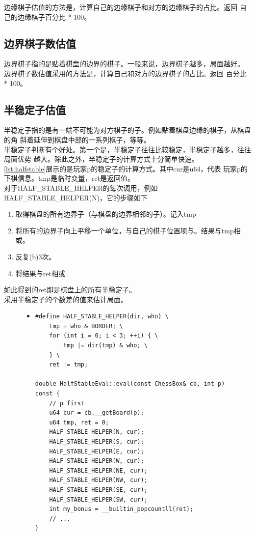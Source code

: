 \documentclass[a4paper]{article}
\begin{document}
边缘棋子估值的方法是，计算自己的边缘棋子和对方的边缘棋子的占比。返回
自己的边缘棋子百分比 * 100。

\subsection{边界棋子数估值}
边界棋子指的是贴着棋盘的边界的棋子。一般来说，边界棋子越多，局面越好。\\

边界棋子数估值采用的方法是，计算自己和对方的边界棋子的占比。返回
百分比 * 100。

\subsection{半稳定子估值}
半稳定子指的是有一端不可能为对方棋子的子。例如贴着棋盘边缘的棋子，从棋盘的角
斜着延伸到棋盘中部的一系列棋子，等等。\\

半稳定子判断有个好处。第一个是，半稳定子往往比较稳定，半稳定子越多，往往局面优势
越大。除此之外，半稳定子的计算方式十分简单快速。\\

\autoref{lst:halfstable}展示的是玩家p的稳定子的计算方式。其中cur是u64，代表
玩家p的下棋信息。tmp是临时变量，ret是返回值。\\

对于HALF\_STABLE\_HELPER的每次调用，例如HALF\_STABLE\_HELPER(N)，它的步骤如下
\begin{enumerate}[label=(\alph*)]
    \item 取得棋盘的所有边界子（与棋盘的边界相邻的子）。记入tmp
    \item 将所有的边界子向上平移一个单位，与自己的棋子位置项与。结果与tmp相或。
    \item 反复(b)3次。
    \item 将结果与ret相或
\end{enumerate}
如此得到的ret即是棋盘上的所有半稳定子。\\

采用半稳定子的个数差的值来估计局面。

\begin{figure}[!hbt]
\begin{itemize}
\item[] \begin{lstlisting}[style=mycpp, label=lst:halfstable, caption=半稳定子的计算方式]
#define HALF_STABLE_HELPER(dir, who) \
    tmp = who & BORDER; \
    for (int i = 0; i < 3; ++i) { \
        tmp |= dir(tmp) & who; \
    } \
    ret |= tmp;

double HalfStableEval::eval(const ChessBox& cb, int p) const {
    // p first
    u64 cur = cb.__getBoard(p);
    u64 tmp, ret = 0;
    HALF_STABLE_HELPER(N, cur);
    HALF_STABLE_HELPER(S, cur);
    HALF_STABLE_HELPER(E, cur);
    HALF_STABLE_HELPER(W, cur);
    HALF_STABLE_HELPER(NE, cur);
    HALF_STABLE_HELPER(NW, cur);
    HALF_STABLE_HELPER(SE, cur);
    HALF_STABLE_HELPER(SW, cur);
    int my_bonus = __builtin_popcountll(ret);
    // ...
}
\end{lstlisting}
\end{itemize}
\end{figure}
\end{document}
